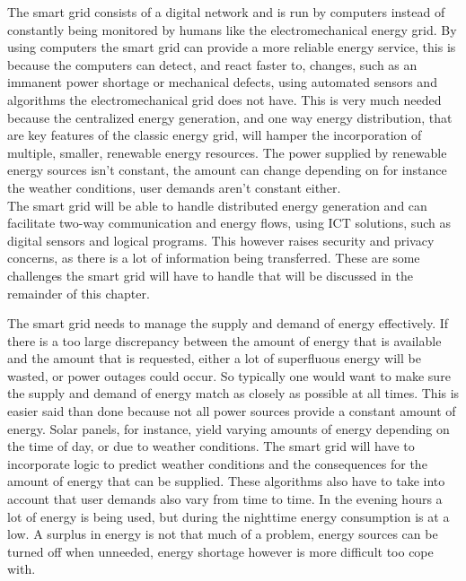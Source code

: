 The smart grid consists of a digital network and is run by computers instead of constantly being monitored by humans like the electromechanical energy grid. By using computers the smart grid can provide a more reliable energy service, this is because the computers can detect, and react faster to, changes, such as an immanent power shortage or mechanical defects, using automated sensors and algorithms the electromechanical grid does not have. This is very much needed because the centralized energy generation, and one way energy distribution, that are key features of the classic energy grid, will hamper the incorporation of multiple, smaller, renewable energy resources. The power supplied by renewable energy sources isn't constant, the amount can change depending on for instance the weather conditions, user demands aren't constant either. \\
The smart grid will be able to handle distributed energy generation and can facilitate two-way communication and energy flows, using ICT solutions, such as digital sensors and logical programs. This however raises security and privacy concerns, as there is a lot of information being transferred. These are some challenges the smart grid will have to handle that will be discussed in the remainder of this chapter. 


The smart grid needs to manage the supply and demand of energy effectively. If there is a too large discrepancy between the amount of energy that is available and the amount that is requested, either a lot of superfluous energy will be wasted, or power outages could occur. 
So typically one would want to make sure the supply and demand of energy match as closely as possible at all times. This is easier said than done because not all power sources provide a constant amount of energy. Solar panels, for instance, yield varying amounts of energy depending on the time of day, or due to weather conditions. The smart grid will have to incorporate logic to predict weather conditions and the consequences for the amount of energy that can be supplied. These algorithms also have to take into account that user demands also vary from time to time. In the evening hours a lot of energy is being used, but during the nighttime energy consumption is at a low. A surplus in energy is not that much of a problem, energy sources can be turned off when unneeded, energy shortage however is more difficult too cope with.

